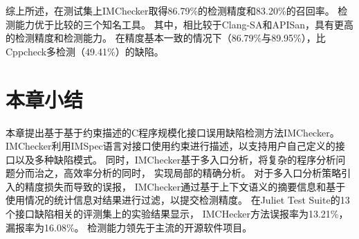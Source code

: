 综上所述，在测试集上IMChecker取得86.79\%的检测精度和83.20\%的召回率。
检测能力优于比较的三个知名工具。
其中，相比较于Clang-SA和APISan，具有更高的检测精度和检测能力。
在精度基本一致的情况下（86.79\%与89.95\%），比Cppcheck多检测（49.41\%）的缺陷。


\section{本章小结}
\label{sec:3.5}
本章提出基于基于约束描述的C程序规模化接口误用缺陷检测方法IMChecker。
IMChecker利用IMSpec语言对接口使用约束进行描述，以支持用户自己定义的接口以及多种缺陷模式。
同时，IMChecker基于多入口分析，将复杂的程序分析问题分而治之，高效率分析的同时，
实现局部的精确分析。
对于多入口分析策略引入的精度损失而导致的误报，
IMChecker通过基于上下文语义的摘要信息和基于使用情况的统计信息对结果进行过滤，以提交检测精度。
在Juliet Test Suite的13个接口缺陷相关的评测集上的实验结果显示，
IMCHecker方法误报率为13.21\%，漏报率为16.08\%。
检测能力领先于主流的开源软件项目。
